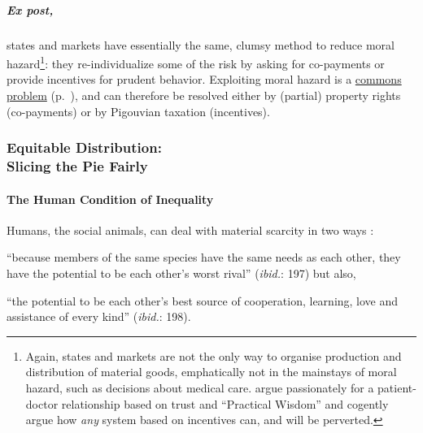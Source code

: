 \subparagraph{Ex post,} states and markets have essentially the same, clumsy method to reduce moral hazard\footnote{
	Again, states and markets are not the only way to organise production and distribution of material goods, emphatically not in the mainstays of moral hazard, such as decisions about medical care. \cite{Schwartz2010} argue passionately for a patient-doctor relationship based on trust and ``Practical Wisdom'' and cogently argue how \emph{any} system based on incentives can, and will be perverted.}:
they re-individualize some of the risk by asking for co-payments or provide incentives for prudent behavior. Exploiting moral hazard is a \hyperref[sec:common-good]{commons problem} (p.~\pageref{sec:common-good}), and can therefore be resolved either by (partial) property rights (co-payments) or by Pigouvian taxation (incentives).

\subsubsection[Equitable Distribution]{Equitable Distribution: \\Slicing the Pie Fairly} \label{sec:distribution}


\paragraph{The Human Condition of Inequality}  \label{sec:human-condition-of-inequality} Humans, the social animals, can deal with material scarcity in two ways \citep{Pickett-2009-kx}: \begin{inparaenum}[1)]
	\item ``because members of the same species have the same needs as each other, they have the potential to be each other's worst rival'' (\emph{ibid.}: 197) but also,
	\item ``the potential to be each other's best source of cooperation, learning, love and assistance of every kind'' (\emph{ibid.}: 198). \end{inparaenum}

